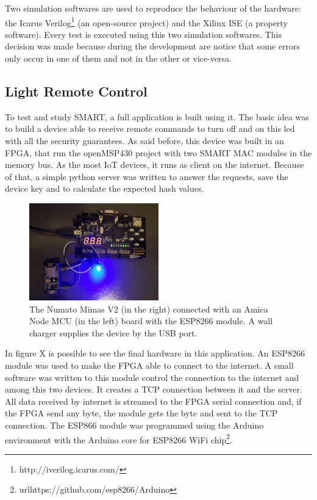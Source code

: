 Two simulation softwares are used to reproduce the behaviour of the hardware: the Icarus Verilog\footnote{http://iverilog.icarus.com/} (an open-source project) and the Xilinx ISE (a property software). Every test is executed using this two simulation softwares. This decision was made because during the development are notice that some errors only occur in one of them and not in the other or vice-versa.

\subsection{Light Remote Control}

To test and study SMART, a full application is built using it. The basic idea was to build a device able to receive remote commands to turn off and on this led with all the security guarantees. As said before, this device was built in an FPGA, that run the openMSP430 project with two SMART MAC modules in the memory bus.  As the most IoT devices, it runs as client on the internet. Because of that, a simple python server was written to answer the requests, save the device key and to calculate the expected hash values.

\begin{figure}[h]
	\centering
	\includegraphics[width=0.50\textwidth]{figuras/real}
	\caption{The Numato Mimas V2 (in the right) connected with an Amica Node MCU (in the left) board with the ESP8266 module. A wall charger supplies the device by the USB port.}
	\label{fig:real}
\end{figure}

In figure X is possible to see the final hardware in this application. An ESP8266 module was used to make the FPGA able to connect to the internet. A small software was written to this module control the connection to the internet and  among this two devices. It creates a TCP connection between it and the server. All data received by internet is streamed to the FPGA serial connection and, if the FPGA send any byte, the module gets the byte and sent to the TCP connection. The ESP866 module was programmed using the Arduino environment with the Arduino core for ESP8266 WiFi chip\footnote{url{https://github.com/esp8266/Arduino}}. 

